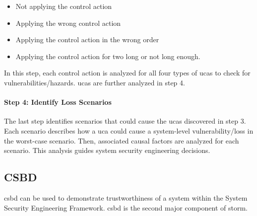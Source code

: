 \documentclass[../../main/main.tex]{subfiles}
\begin{document}
\begin{itemize}
\item Not applying the control action
\item Applying the wrong control action
\item Applying the control action in the wrong order
\item Applying the control action for two long or not long enough.
\end{itemize}

In this step, each control action is analyzed for all four types of \gls{uca}s to check for vulnerabilities/hazards.  \gls{uca}s are further analyzed in step 4.


\paragraph*{Step 4: Identify Loss Scenarios}
The last step identifies scenarios that could cause the \gls{uca}s discovered in step 3.  Each scenario describes how a \gls{uca} could cause a system-level vulnerability/loss in the worst-case scenario.  Then, associated causal factors are analyzed for each scenario.  This analysis guides system security engineering decisions.


%
%
%
\subsection{CSBD}\label{ssec:csbd}

\gls{csbd} can be used to demonstrate trustworthiness of a system within the System Security Engineering Framework.  \gls{csbd} is the second major component of \gls{storm}.
\end{document}
